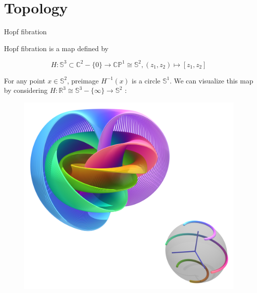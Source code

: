 \documentclass[12pt]{beamer}
\begin{document}
\section{Topology}


\begin{frame}{Hopf fibration}

  Hopf fibration is a map defined by 

  \[ H: \mathbb{S}^3 \subset \mathbb{C}^2-\{0\} \to \mathbb{CP}^1 \cong \mathbb{S}^2, (z_1,z_2) \mapsto [z_1,z_2] \]

  For any point $x\in \mathbb{S}^2$, preimage $H^{-1}(x)$ is a circle $\mathbb{S}^1$. 
\pause
  We can visualize this map by considering $ H: \mathbb{R}^3\cong \mathbb{S}^3-\{\infty\} \to \mathbb{S}^2 $ :
\begin{figure}
  \begin{center}
    \href{https://www.youtube.com/watch?v=AKotMPGFJYk}{ \includegraphics[height= 0.4\textheight]{figures/Hopf_Fibration.png} }
  \end{center}
\end{figure}

\end{frame}
\end{document}

